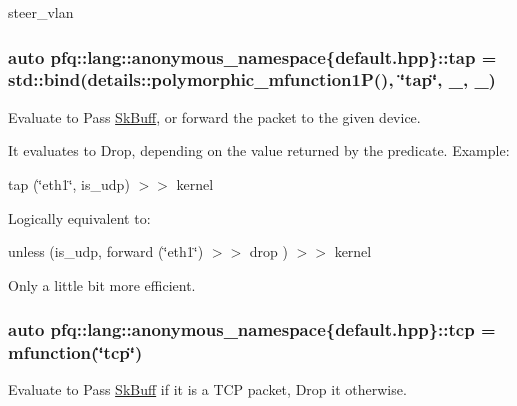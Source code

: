steer\+\_\+vlan \hypertarget{namespacepfq_1_1lang_1_1anonymous__namespace_02default_8hpp_03_abeef983e47756eaabd5033e4561f1ff0}{
\subsubsection[{tap}]{\setlength{\rightskip}{0pt plus 5cm}auto pfq\+::lang\+::anonymous\+\_\+namespace\{default.\+hpp\}\+::tap = std\+::bind(details\+::polymorphic\+\_\+mfunction1\+P(), \char`\"{}tap\char`\"{}, \+\_, \+\_)}}\label{namespacepfq_1_1lang_1_1anonymous__namespace_02default_8hpp_03_abeef983e47756eaabd5033e4561f1ff0}


Evaluate to {\ttfamily Pass} \hyperlink{structpfq_1_1lang_1_1SkBuff}{Sk\+Buff}, or forward the packet to the given device. 

It evaluates to {\ttfamily Drop}, depending on the value returned by the predicate. Example\+:

tap (\char`\"{}eth1\char`\"{}, is\+\_\+udp) $>$$>$ kernel

Logically equivalent to\+:

unless (is\+\_\+udp, forward (\char`\"{}eth1\char`\"{}) $>$$>$ drop ) $>$$>$ kernel

Only a little bit more efficient. \hypertarget{namespacepfq_1_1lang_1_1anonymous__namespace_02default_8hpp_03_a5b8ca91a33a120e7e0807e63c8b51b28}{
\subsubsection[{tcp}]{\setlength{\rightskip}{0pt plus 5cm}auto pfq\+::lang\+::anonymous\+\_\+namespace\{default.\+hpp\}\+::tcp = {\bf mfunction}(\char`\"{}tcp\char`\"{})}}\label{namespacepfq_1_1lang_1_1anonymous__namespace_02default_8hpp_03_a5b8ca91a33a120e7e0807e63c8b51b28}


Evaluate to {\ttfamily Pass} \hyperlink{structpfq_1_1lang_1_1SkBuff}{Sk\+Buff} if it is a T\+C\+P packet, {\ttfamily Drop} it otherwise. 

